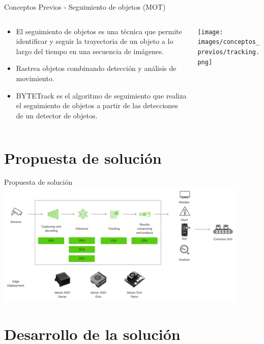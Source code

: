 \documentclass[spanish]{beamer}
\begin{document}
\begin{frame}{Conceptos Previos - Seguimiento de objetos (MOT)}
    \begin{columns}
        \begin{column}{0.4\textwidth}
            \begin{itemize}
                \item El seguimiento de objetos es una técnica que permite identificar y seguir la trayectoria de un objeto a lo largo del tiempo en una secuencia de imágenes.
                \item Rastrea objetos combinando detección y análisis de movimiento.
                \item BYTETrack es el algoritmo de seguimiento que realiza el seguimiento de objetos a partir de las detecciones de un detector de objetos. 
            \end{itemize}
        \end{column}
        \begin{column}{0.7\textwidth}
            \texttt{[image: images/conceptos\_previos/tracking.png]}
        \end{column}
    \end{columns}
\end{frame}


\section{Propuesta de solución}
\begin{frame}{Propuesta de solución}
    \includegraphics[width=0.9\textwidth]{images/solucion_propuesta/figura_TFG_v3.png}
\end{frame}

\section{Desarrollo de la solución}
\end{document}
